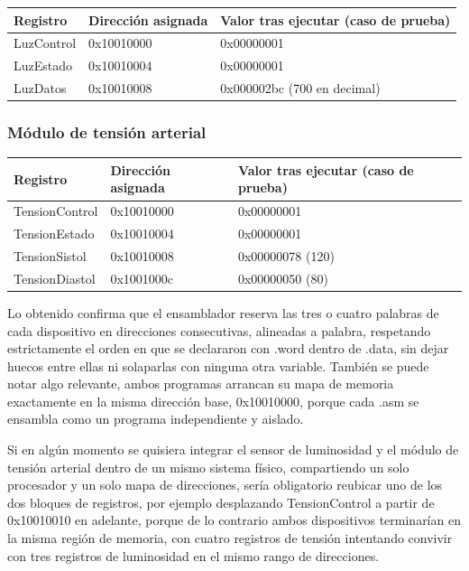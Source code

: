 \documentclass[12pt, letterpaper]{article}
\begin{document}
\begin{table}[H]
\centering
\begin{tabular}{| l | l | l |}
\hline
\textbf{Registro} & \textbf{Dirección asignada} & \textbf{Valor tras ejecutar (caso de prueba)} \\
\hline
LuzControl & 0x10010000 & 0x00000001 \\
\hline
LuzEstado & 0x10010004 & 0x00000001 \\
\hline
LuzDatos & 0x10010008 & 0x000002bc (700 en decimal) \\
\hline
\end{tabular}
\end{table}

\subsubsection*{\centering Módulo de tensión arterial}

\begin{table}[H]
\centering
\begin{tabular}{| l | l | l |}
\hline
\textbf{Registro} & \textbf{Dirección asignada} & \textbf{Valor tras ejecutar (caso de prueba)} \\
\hline
TensionControl & 0x10010000 & 0x00000001 \\
\hline
TensionEstado & 0x10010004 & 0x00000001 \\
\hline
TensionSistol & 0x10010008 & 0x00000078 (120) \\
\hline
TensionDiastol & 0x1001000c & 0x00000050 (80) \\
\hline
\end{tabular}
\end{table}

Lo obtenido confirma que el ensamblador reserva las tres o cuatro palabras de cada dispositivo en direcciones consecutivas, alineadas a palabra, respetando estrictamente el orden en que se declararon con .word dentro de .data, sin dejar huecos entre ellas ni solaparlas con ninguna otra variable. También se puede notar algo relevante, ambos programas arrancan su mapa de memoria exactamente en la misma dirección base, 0x10010000, porque cada .asm se ensambla como un programa independiente y aislado.

Si en algún momento se quisiera integrar el sensor de luminosidad y el módulo de tensión arterial dentro de un mismo sistema físico, compartiendo un solo procesador y un solo mapa de direcciones, sería obligatorio reubicar uno de los dos bloques de registros, por ejemplo desplazando TensionControl a partir de 0x10010010 en adelante, porque de lo contrario ambos dispositivos terminarían en la misma región de memoria, con cuatro registros de tensión intentando convivir con tres registros de luminosidad en el mismo rango de direcciones.
\end{document}

